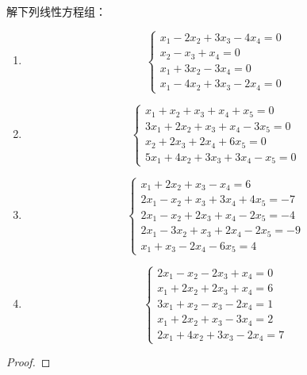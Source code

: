 \begin{problem}
解下列线性方程组：
\begin{enumerate}
    \item \begin{equation*}
              \begin{cases}
                  x_1-2x_2+3x_3-4x_4=0 \\
                  x_2-x_3+x_4=0        \\
                  x_1+3x_2-3x_4=0      \\
                  x_1-4x_2+3x_3-2x_4=0
              \end{cases}
          \end{equation*}
    \item \begin{equation*}
              \begin{cases}
                  x_1+x_2+x_3+x_4+x_5=0    \\
                  3x_1+2x_2+x_3+x_4-3x_5=0 \\
                  x_2+2x_3+2x_4+6x_5=0     \\
                  5x_1+4x_2+3x_3+3x_4-x_5=0
              \end{cases}
          \end{equation*}
    \item \begin{equation*}
              \begin{cases}
                  x_1+2x_2+x_3-x_4=6         \\
                  2x_1-x_2+x_3+3x_4+4x_5=-7  \\
                  2x_1-x_2+2x_3+x_4-2x_5=-4  \\
                  2x_1-3x_2+x_3+2x_4-2x_5=-9 \\
                  x_1+x_3-2x_4-6x_5=4
              \end{cases}
          \end{equation*}
    \item \begin{equation*}
              \begin{cases}
                  2x_1-x_2-2x_3+x_4=0 \\
                  x_1+2x_2+2x_3+x_4=6 \\
                  3x_1+x_2-x_3-2x_4=1 \\
                  x_1+2x_2+x_3-3x_4=2 \\
                  2x_1+4x_2+3x_3-2x_4=7
              \end{cases}
          \end{equation*}
\end{enumerate}
\end{problem}
\begin{proof}

\end{proof}

